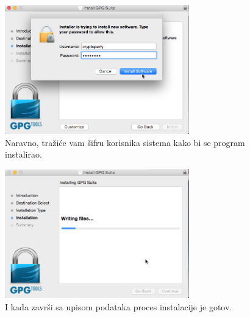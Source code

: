\documentclass[a4paper,11pt]{article}
\begin{document}
\begin{figure}[!h]
	\begin{center}
		\includegraphics[width=8cm]{06_Oracle_VM_VirtualBox.png}
		\caption{Naravno, tra\v{z}i\'{c}e vam \v{s}ifru korisnika sistema kako bi se program instalirao.}
		\label{gpgtools_install4}
	\end{center}
\end{figure}
\newpage
\begin{figure}[!h]
	\begin{center}
		\includegraphics[width=8cm]{07_Oracle_VM_VirtualBox.png}
		\caption{I kada zavr\v{s}i sa upisom podataka proces instalacije je gotov.}
		\label{gpgtools_install5}
	\end{center}
\end{figure}
\newpage
\end{document}
